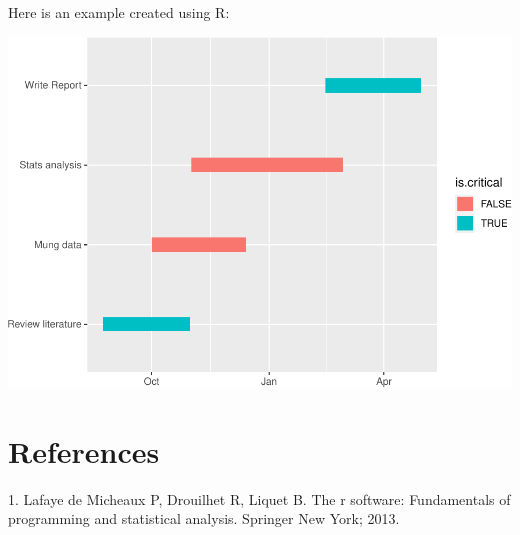 \documentclass[mstat,12pt]{unswthesis}
\newenvironment{CSLReferences}%
  {}%
  {\par}
\begin{document}
\bigskip

Here is an example created using R:

\includegraphics{unsw-ZZSC9020-Project-Plan-template_files/figure-latex/unnamed-chunk-1-1.pdf}

\hypertarget{references}{%
\chapter*{References}\label{references}}




\hypertarget{refs}{}
\begin{CSLReferences}{0}{0}
\leavevmode{}%
1. Lafaye de Micheaux P, Drouilhet R, Liquet B. The r software:
Fundamentals of programming and statistical analysis. Springer New York;
2013.

\end{CSLReferences}
\end{document}
